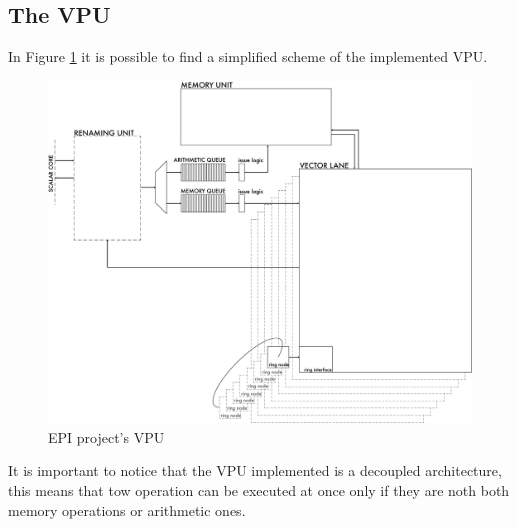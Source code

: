 \subsection{The VPU}
In Figure \ref{VPU} it is possible to find a simplified scheme of the implemented VPU.

\begin{figure}[H]
    \centering
    \includegraphics[scale = 0.5]{Chapter_1/img/VPU.png}
    \caption{EPI project's VPU}
    \label{VPU}
\end{figure}
It is important to notice that the VPU implemented is a decoupled architecture, this means that tow operation can be executed at once only if they are noth both memory operations or arithmetic ones.


